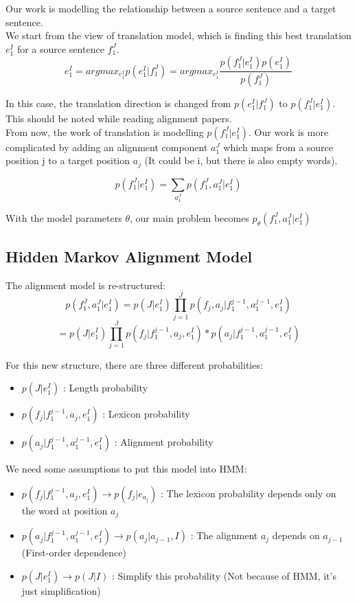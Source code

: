 \documentclass{article}
\begin{document}
Our work is modelling the relationship between a source sentence and a target sentence. \\
We start from the view of translation model, which is finding this best translation $e_1^I$ for a source sentence $f_1^J$.
\begin{equation}
e_1^I = argmax_{e_1^I} p(e_1^I|f_1^J) = argmax_{e_1^I} \frac{p(f_1^J|e_1^I)p(e_1^I)}{p(f_1^J)}
\end{equation}

In this case, the translation direction is changed from $p(e_1^I|f_1^J)$ to $p(f_1^J|e_1^I)$. This should be noted while reading alignment papers. \\

From now, the work of translation is modelling $p(f_1^J|e_1^I)$. Our work is more complicated by adding an alignment component $a_1^J$ which maps from a source position j to a target position $a_j$ (It could be i, but there is also empty words).

\begin{equation}
p(f_1^J|e_1^I) = \sum_{a_1^J} p(f_1^J, a_1^J|e_1^I)
\end{equation}

With the model parameters $\theta$, our main problem becomes $p_{\theta}(f_1^J, a_1^J|e_1^I)$

\subsection{Hidden Markov Alignment Model}
The alignment model is re-structured:
\begin{equation}
p(f_1^J, a_1^J|e_1^I) = p(J|e_1^I) \prod_{j=1}^J p(f_j, a_j | f_1^{j-1}, a_1^{j-1}, e_1^I)
\end{equation}
\begin{equation}
= p(J|e_1^I) \prod_{j=1}^J p( f_j | f_1^{j-1}, a_j, e_1^I) * p( a_j | f_1^{j-1}, a_1^{j-1}, e_1^I)
\end{equation}

For this new structure, there are three different probabilities:
\begin{itemize}
\item $p(J|e_1^I)$ : Length probability
\item $p( f_j | f_1^{j-1}, a_j, e_1^I)$ : Lexicon  probability
\item $p( a_j | f_1^{j-1}, a_1^{j-1}, e_1^I)$ : Alignment probability
\end{itemize}

We need some assumptions to put this model into HMM:
\begin{itemize}
\item $p( f_j | f_1^{j-1}, a_j, e_1^I) \rightarrow p(f_j | e_{a_j}) $ : The lexicon probability depends only on the word at position $a_j$
\item $p( a_j | f_1^{j-1}, a_1^{j-1}, e_1^I) \rightarrow p(a_j | a_{j-1}, I) $ : The alignment $a_j$ depends on $a_{j - 1}$  (First-order dependence)
\item $p(J|e_1^I) \rightarrow p(J|I)$ : Simplify this probability (Not because of HMM, it's just simplification)
\end{itemize}
\end{document}
